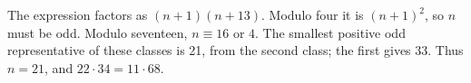 The expression factors as $(n+1)(n+13)$. Modulo four it is $(n+1)^2$, so $n$ must be odd. Modulo seventeen, $n\equiv16$ or $4$. The smallest positive odd representative of these classes is 21, from the second class; the first gives 33. Thus $\boxed{n=21}$, and $22\cdot34=11\cdot68$.
